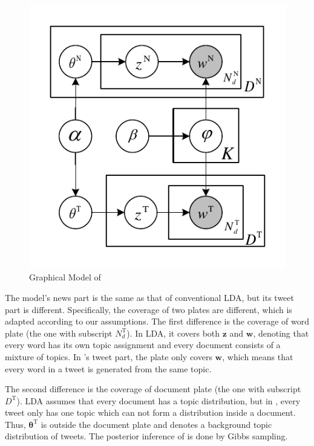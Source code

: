 \begin{figure}[h]
\centering
\includegraphics[width=.8\linewidth]{2016_icwsm_topicDynamic/figures/stlda_model.pdf}
\caption{Graphical Model of \stlda}\label{fig:stlda}
\end{figure}

The model's news part is the same as that of conventional LDA, but its tweet part is different. Specifically, the coverage of two plates are different, which is adapted according to our assumptions. The first difference is the coverage of word plate (the one with subscript $N^\mathrm{T}_d$). In LDA, it covers both $\bm{z}$ and $\bm{w}$, denoting that every word has its own topic assignment and every document consists of a mixture of topics. In \stlda's tweet part, the plate only covers $\bm{w}$, which means that every word in a tweet is generated from the same topic.

The second difference is the coverage of document plate (the one with subscript $D^\mathrm{T}$). LDA assumes that every document has a topic distribution, but in \stlda, every tweet only has one topic which can not form a distribution inside a document. Thus, $\bm{\theta^\mathrm{T}}$ is outside the document plate and denotes a background topic distribution of tweets. The posterior inference of \stlda is done by Gibbs sampling.



